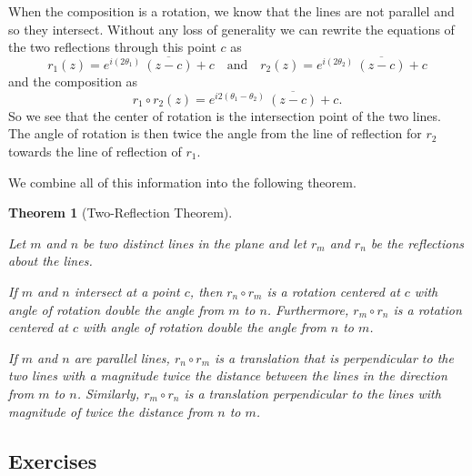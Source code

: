 \documentclass[
]{book}
\newtheorem{theorem}{Theorem}[chapter]
\theoremstyle{definition}
\theoremstyle{definition}
\theoremstyle{definition}
\theoremstyle{definition}
\theoremstyle{remark}
\begin{document}
When the composition is a rotation, we know that the lines are not parallel and so they intersect. Without any loss of generality we can rewrite the equations of the two reflections through this point \(c\) as
\[r_1(z) = e^{i (2\theta_1)} \: \overline{(z-c)} +c \quad \mbox{and} \quad r_2(z) = e^{i (2\theta_2)} \: \overline{(z-c)} + c\]
and the composition as \[r_1 \circ r_2 (z) = e^{i2(\theta_1-\theta_2)} \: \overline{(z-c)} +c.\]
So we see that the center of rotation is the intersection point of the two lines. The angle of rotation is then twice the angle from the line of reflection for \(r_2\) towards the line of reflection of \(r_1\).

We combine all of this information into the following theorem.

\begin{theorem}[Two-Reflection Theorem]
\protect\hypertarget{thm:unlabeled-div-279}{}\label{thm:unlabeled-div-279}

Let \(m\) and \(n\) be two distinct lines in the plane and let \(r_m\) and \(r_n\) be the reflections about the lines.

If \(m\) and \(n\) intersect at a point \(c\), then \(r_n\circ r_m\) is a rotation centered at \(c\) with angle of rotation double the angle from \(m\) to \(n\). Furthermore, \(r_m \circ r_n\) is a rotation centered at \(c\) with angle of rotation double the angle from \(n\) to \(m\).

If \(m\) and \(n\) are parallel lines, \(r_n\circ r_m\) is a translation that is perpendicular to the two lines with a magnitude twice the distance between the lines in the direction from \(m\) to \(n\). Similarly, \(r_m \circ r_n\) is a translation perpendicular to the lines with magnitude of twice the distance from \(n\) to \(m\).

\end{theorem}

\hypertarget{exercises-54}{%
\subsection{Exercises}\label{exercises-54}}
\end{document}

